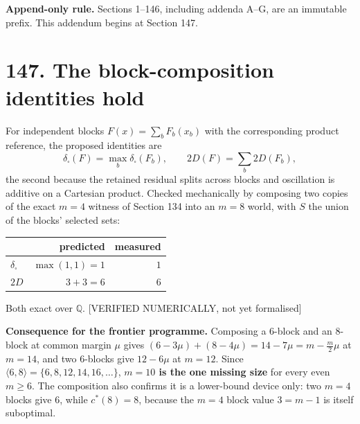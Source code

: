 \documentclass[9pt,twocolumn]{article}
\newcommand{\eclass}[1]{\textsf{[#1]}}
\renewcommand{\_}{\CIGunderscore\allowbreak}
\begin{document}
\sloppy
{}

\textbf{Append-only rule.} Sections 1--146, including addenda A--G, are an immutable prefix. This addendum begins at Section 147.

\section*{147. The block-composition identities hold}
For independent blocks $F(x)=\sum_b F_b(x_b)$ with the corresponding product reference, the proposed identities are
\[\delta_\square(F)=\max_b \delta_\square(F_b),\qquad 2D(F)=\sum_b 2D(F_b),\]
the second because the retained residual splits across blocks and oscillation is additive on a Cartesian product. Checked mechanically by composing two copies of the exact $m=4$ witness of Section 134 into an $m=8$ world, with $S$ the union of the blocks' selected sets:
\begin{center}\scriptsize
\begin{tabularx}{0.98\columnwidth}{X r r}
\toprule
 & predicted & measured\\
\midrule
$\delta_\square$ & $\max(1,1)=1$ & $1$\\
$2D$ & $3+3=6$ & $6$\\
\bottomrule
\end{tabularx}
\end{center}
Both exact over $\mathbb{Q}$. \eclass{VERIFIED NUMERICALLY, not yet formalised}

\textbf{Consequence for the frontier programme.} Composing a $6$-block and an $8$-block at common margin $\mu$ gives $(6-3\mu)+(8-4\mu)=14-7\mu=m-\tfrac m2\mu$ at $m=14$, and two $6$-blocks give $12-6\mu$ at $m=12$. Since $\langle 6,8\rangle=\{6,8,12,14,16,\dots\}$, \textbf{$m=10$ is the one missing size} for every even $m\ge6$. The composition also confirms it is a lower-bound device only: two $m=4$ blocks give $6$, while $c^\ast(8)=8$, because the $m=4$ block value $3=m-1$ is itself suboptimal.
\end{document}
